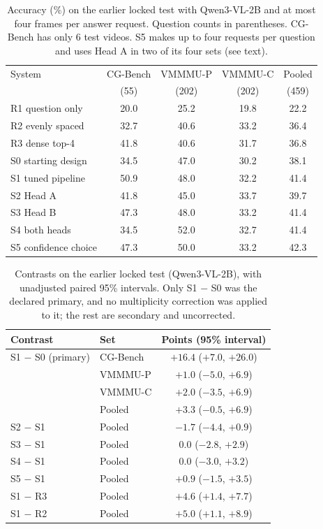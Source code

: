 \begin{table}[t]
\centering
\small
\setlength{\tabcolsep}{3.5pt}
\begin{tabular}{@{}lcccc@{}}
\toprule
System & CG-Bench & VMMMU-P & VMMMU-C & Pooled \\
 & (55) & (202) & (202) & (459) \\
\midrule
R1 question only & 20.0 & 25.2 & 19.8 & 22.2 \\
R2 evenly spaced & 32.7 & 40.6 & 33.2 & 36.4 \\
R3 dense top-4 & 41.8 & 40.6 & 31.7 & 36.8 \\
S0 starting design & 34.5 & 47.0 & 30.2 & 38.1 \\
S1 tuned pipeline & 50.9 & 48.0 & 32.2 & 41.4 \\
S2 Head A & 41.8 & 45.0 & 33.7 & 39.7 \\
S3 Head B & 47.3 & 48.0 & 33.2 & 41.4 \\
S4 both heads & 34.5 & 52.0 & 32.7 & 41.4 \\
S5 confidence choice & 47.3 & 50.0 & 33.2 & 42.3 \\
\bottomrule
\end{tabular}
\caption{Accuracy (\%) on the earlier locked test with Qwen3-VL-2B and at most four frames per answer request. Question counts in parentheses. CG-Bench has only 6 test videos. S5 makes up to four requests per question and uses Head A in two of its four sets (see text).}
\label{tab:s-earlier}
\end{table}

\begin{table}[t]
\centering
\small
\setlength{\tabcolsep}{4pt}
\begin{tabular}{@{}llc@{}}
\toprule
Contrast & Set & Points (95\% interval) \\
\midrule
S1 $-$ S0 (primary) & CG-Bench & $+16.4$ ($+7.0$, $+26.0$) \\
 & VMMMU-P & $+1.0$ ($-5.0$, $+6.9$) \\
 & VMMMU-C & $+2.0$ ($-3.5$, $+6.9$) \\
 & Pooled & $+3.3$ ($-0.5$, $+6.9$) \\
\midrule
S2 $-$ S1 & Pooled & $-1.7$ ($-4.4$, $+0.9$) \\
S3 $-$ S1 & Pooled & $0.0$ ($-2.8$, $+2.9$) \\
S4 $-$ S1 & Pooled & $0.0$ ($-3.0$, $+3.2$) \\
S5 $-$ S1 & Pooled & $+0.9$ ($-1.5$, $+3.5$) \\
S1 $-$ R3 & Pooled & $+4.6$ ($+1.4$, $+7.7$) \\
S1 $-$ R2 & Pooled & $+5.0$ ($+1.1$, $+8.9$) \\
\bottomrule
\end{tabular}
\caption{Contrasts on the earlier locked test (Qwen3-VL-2B), with unadjusted paired 95\% intervals. Only S1 $-$ S0 was the declared primary, and no multiplicity correction was applied to it; the rest are secondary and uncorrected.}
\label{tab:s-earlier-contrasts}
\end{table}

